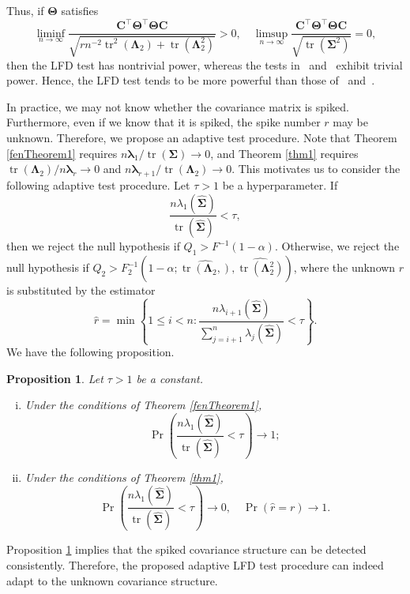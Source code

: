 \documentclass[12pt]{article} %
\DeclareMathOperator{\mytr}{tr}
\newcommand{\bC}{\mathbf{C}}
\newcommand{\bfsym}[1]{\ensuremath{\boldsymbol{#1}}}
\def\blambda {\bfsym {\lambda}}
\def\bLambda {\bfsym {\Lambda}}
\def\bSigma {\bfsym {\Sigma}}
\def\bTheta {\bfsym {\Theta}}
\newtheorem{proposition}{Proposition}
\theoremstyle{definition}
\begin{document}
Thus, if $\bTheta$ satisfies
\begin{equation*}
    \liminf_{n\to \infty}\frac{
    \bC^\top \bTheta^\top \bTheta \bC
}{
    \sqrt{
        rn^{-2} \mytr^2 (\bLambda_2) + \mytr(\bLambda_2^2)
    }
}
>0,
\quad
    \limsup_{n\to \infty}\frac{
    \bC^\top \bTheta^\top \bTheta \bC
}{
    \sqrt{
        \mytr(\bSigma^2)
    }
}
=0,
\end{equation*}
then the LFD test has nontrivial power, whereas the tests in~\cite{Bai1996Efiect} and~\cite{Chen2010A} exhibit trivial power.
Hence, the LFD test tends to be more powerful than those of~\cite{Bai1996Efiect} and~\cite{Chen2010A}.


In practice, we may not know whether the covariance matrix is spiked. Furthermore, even if we know that it is spiked, the spike number $r$ may be unknown.
Therefore, we propose an adaptive test procedure.
Note that Theorem \ref{fenTheorem1} requires $n\blambda_1/\mytr(\bSigma)\to 0$, and Theorem \ref{thm1} requires $\mytr(\bLambda_2)/n\blambda_r\to 0$ and $n\blambda_{r+1}/\mytr(\bLambda_2)\to 0$.
This motivates us to consider the following adaptive test procedure.
Let $\tau>1$ be a hyperparameter.
If
\begin{equation*}
    \frac{
        n\lambda_1(\hat{\bSigma})
    }{
\mytr(\hat{\bSigma})}
<\tau,
\end{equation*}
then we reject the null hypothesis if $Q_1 > F^{-1}(1-\alpha)$.
Otherwise, we reject the null hypothesis if $Q_2> F_2^{-1}(1-\alpha;\widehat{\mytr(\bLambda_2,)},\widehat{\mytr(\bLambda_2^2)})$, where the unknown $r$ is substituted by the estimator
\begin{equation*}
    \hat{r}=\min
    \left\{
1\leq i< n:
    \frac{
        n\lambda_{i+1}(\hat{\bSigma})
}
{    
    \sum_{j=i+1}^n
\lambda_j(\hat{\bSigma})}
<
\tau
\right\}
.
\end{equation*}
We have the following proposition.
\begin{proposition}\label{numberConsistency}
    Let $\tau>1$ be a constant.
    \begin{enumerate}[(i)]
        \item 
    Under the conditions of Theorem \ref{fenTheorem1}, 
    \begin{equation*}
        \Pr\left(
    \frac{
        n\lambda_1(\hat{\bSigma})
    }{
    \mytr(\hat{\bSigma})}
<\tau
\right)\to 1
;
    \end{equation*}
\item
    Under the conditions of Theorem \ref{thm1},
    \begin{equation*}
        \Pr\left(
    \frac{
        n\lambda_1(\hat{\bSigma})
    }{
    \mytr(\hat{\bSigma})}
<\tau
\right)\to 0,\quad
\Pr(\hat{r}= r)\to 1
.
    \end{equation*}
    \end{enumerate}
\end{proposition}
Proposition \ref{numberConsistency} implies that the spiked covariance structure can be detected consistently.
Therefore, the proposed adaptive LFD test procedure can indeed adapt to the unknown covariance structure.
\end{document}
